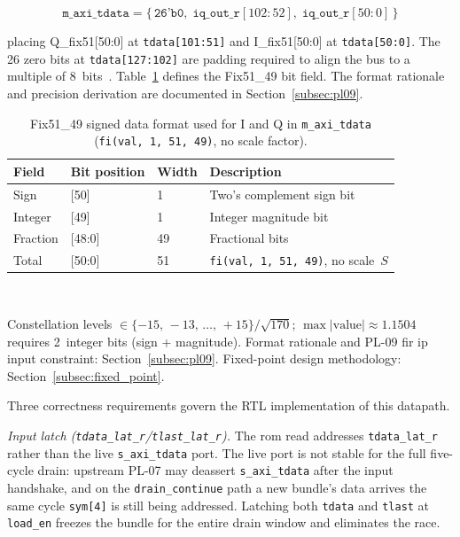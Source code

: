 \begin{equation}
  \mathtt{m\_axi\_tdata} =
  \{\,\texttt{26'b0},\;
    \mathtt{iq\_out\_r}[102:52],\;
    \mathtt{iq\_out\_r}[50:0]\,\}
  \label{eq:pl08_tdata}
\end{equation}

\noindent placing Q\_fix51[50:0] at \texttt{tdata[101:51]} and
I\_fix51[50:0] at \texttt{tdata[50:0]}.
The 26 zero bits at \texttt{tdata[127:102]} are padding required to
align the bus to a multiple of 8~bits~\cite{ARM_IHI0022}.
Table~\ref{tab:pl08_fix51} defines the Fix51\_49 bit field.
The format rationale and precision derivation are documented in
Section~\ref{subsec:pl09}.

\begin{table}[htbp]
  \caption{Fix51\_49 signed data format used for I and Q in
           \texttt{m\_axi\_tdata}
           (\texttt{fi(val,\,1,\,51,\,49)}, no scale factor).}
  \label{tab:pl08_fix51}
  \centering
  \small
  \begin{tabular}{llll}
    \hline
    Field     & Bit position & Width & Description \\
    \hline
    Sign      & {[50]}       & 1     & Two's complement sign bit \\[2pt]
    Integer   & {[49]}       & 1     & Integer magnitude bit \\[2pt]
    Fraction  & {[48:0]}     & 49    & Fractional bits \\
    \hline
    Total     & {[50:0]}     & 51    & \texttt{fi(val,\,1,\,51,\,49)}, no scale~$S$ \\
    \hline
  \end{tabular}\\[4pt]
  \begin{minipage}{\linewidth}
    \small
    Constellation levels $\in \{-15,\,-13,\,\ldots,\,+15\}/\sqrt{170}$;
    $\max|\text{value}| \approx 1.1504$ requires 2~integer bits
    (sign + magnitude).
    Format rationale and PL-09 \ac{fir} \ac{ip} input constraint:
    Section~\ref{subsec:pl09}.
    Fixed-point design methodology: Section~\ref{subsec:fixed_point}.
  \end{minipage}
\end{table}

Three correctness requirements govern the RTL implementation of this
datapath.

\textit{Input latch (\texttt{tdata\_lat\_r}/\texttt{tlast\_lat\_r}).}
The \ac{rom} read addresses \texttt{tdata\_lat\_r} rather than the
live \texttt{s\_axi\_tdata} port.
The live port is not stable for the full five-cycle drain: upstream
PL-07 may deassert \texttt{s\_axi\_tdata} after the input handshake,
and on the \texttt{drain\_continue} path a new bundle's data arrives
the same cycle \texttt{sym[4]} is still being addressed.
Latching both \texttt{tdata} and \texttt{tlast} at \texttt{load\_en}
freezes the bundle for the entire drain window and eliminates the race.

